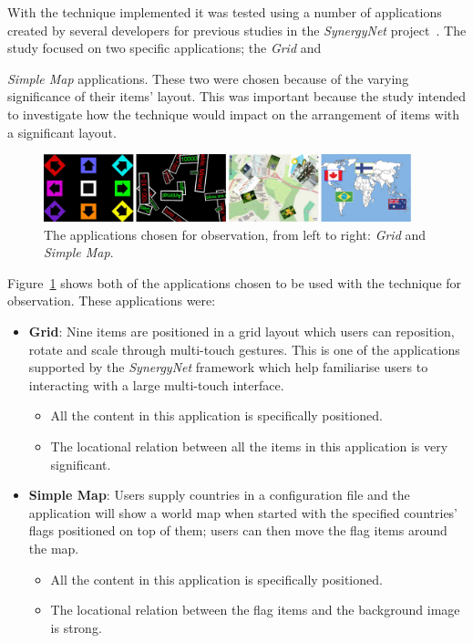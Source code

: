 \documentclass[twocolumn,compsoc]{cvm}
\begin{document}
With the technique implemented it was tested using a number of applications created by several developers for previous studies in the {\emph{SynergyNet}} project~\cite{higgins2011}.
The study focused on two specific applications; the {\emph{Grid}} and {\emph{Simple Map} applications.
These two were chosen because of the varying significance of their items' layout.
This was important because the study intended to investigate how the technique would impact on the arrangement of items with a significant layout.

\begin{figure}[h!] 
 \centering
  \includegraphics[width=0.95\textwidth]{figures/Applications.jpeg}
  \caption{The applications chosen for observation, from left to right:  {\emph{Grid}} and {\emph{Simple Map}}.}
  \label{fig:apps}
\end{figure}

Figure~\ref{fig:apps} shows both of the applications chosen to be used with the technique for observation.
These applications were:\\

\begin{itemize}
  \item \textbf{Grid}: 
  Nine items are positioned in a grid layout which users can reposition, rotate and scale through multi-touch gestures.
  This is one of the applications supported by the {\emph{SynergyNet}} framework which help familiarise users to interacting with a large multi-touch interface. 
    \begin{itemize}
    \item  All the content in this application is specifically positioned.
    \item The locational relation between all the items in this application is very significant.
  \end{itemize}
    \item \textbf{Simple Map}: 
  Users supply countries in a configuration file and the application will show a world map when started with the specified countries' flags positioned on top of them; users can then move the flag items around the map.
    \begin{itemize}
    \item  All the content in this application is specifically positioned.
    \item The locational relation between the flag items and the background image is strong.
  \end{itemize}
\end{itemize}


}
\end{document}
